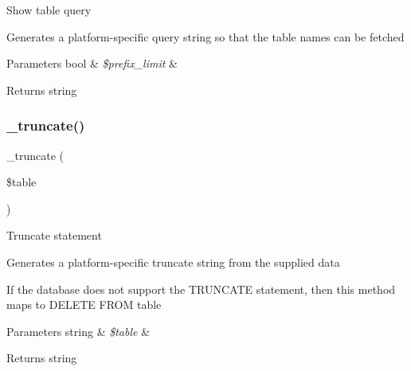 Show table query

Generates a platform-\/specific query string so that the table names can be fetched


\begin{DoxyParams}[1]{Parameters}
bool & {\em \$prefix\+\_\+limit} & \\
\hline
\end{DoxyParams}
\begin{DoxyReturn}{Returns}
string 
\end{DoxyReturn}
\mbox{\label{class_c_i___d_b__pdo__firebird__driver_aa029600528fc1ce660a23ff4b4667f95}} 
\subsubsection{\texorpdfstring{\+\_\+truncate()}{\_truncate()}}
{\footnotesize\ttfamily \+\_\+truncate (\begin{DoxyParamCaption}\item[{}]{\$table }\end{DoxyParamCaption})\hspace{0.3cm}{\ttfamily [protected]}}

Truncate statement

Generates a platform-\/specific truncate string from the supplied data

If the database does not support the T\+R\+U\+N\+C\+A\+TE statement, then this method maps to \textquotesingle{}D\+E\+L\+E\+TE F\+R\+OM table\textquotesingle{}


\begin{DoxyParams}[1]{Parameters}
string & {\em \$table} & \\
\hline
\end{DoxyParams}
\begin{DoxyReturn}{Returns}
string 
\end{DoxyReturn}
\mbox{\label{class_c_i___d_b__pdo__firebird__driver_a2540b03a93fa73ae74c10d0e16fc073e}} 
